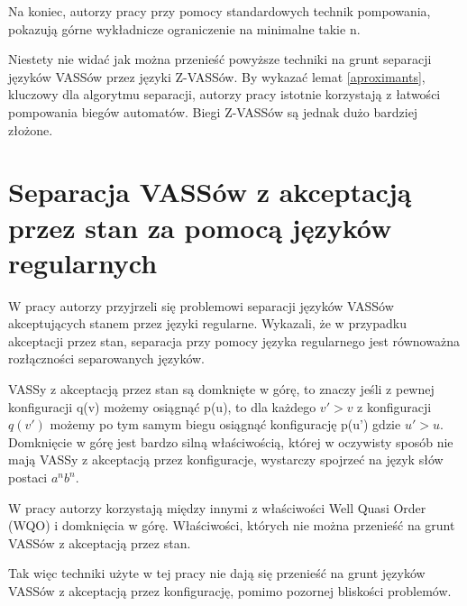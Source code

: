 \documentclass[magisterska]{pracamgr}
\begin{document}
    Na koniec, autorzy pracy przy pomocy standardowych technik pompowania, pokazują górne wykładnicze ograniczenie na minimalne takie n.

    Niestety nie widać jak można przenieść powyższe techniki na grunt separacji języków VASSów przez języki Z-VASSów.
    By wykazać lemat \ref{aproximants}, kluczowy dla algorytmu separacji, autorzy pracy istotnie korzystają z łatwości pompowania biegów automatów.
    Biegi Z-VASSów są jednak dużo bardziej złożone.


    \section{Separacja VASSów z akceptacją przez stan za pomocą języków regularnych}
    W pracy  \cite{sep1} autorzy przyjrzeli się problemowi separacji języków VASSów akceptujących stanem przez języki regularne.
    Wykazali, że w przypadku akceptacji przez stan, separacja przy pomocy języka regularnego jest równoważna rozłączności
    separowanych języków.

    VASSy z akceptacją przez stan są domknięte w górę, to znaczy jeśli z pewnej konfiguracji q(v) możemy osiągnąć p(u),
    to dla każdego $v' > v$ z konfiguracji $q(v')$ możemy po tym samym biegu osiągnąć konfigurację p(u') gdzie $u' > u$.
    Domknięcie w górę jest bardzo silną właściwością, której w oczywisty sposób nie mają VASSy z akceptacją przez konfiguracje,
    wystarczy spojrzeć na język słów postaci $a^n b^n$.


    W pracy autorzy korzystają między innymi z właściwości Well Quasi Order (WQO) i domknięcia w górę.
    Właściwości, których nie można przenieść na grunt VASSów z akceptacją przez stan.

    Tak więc techniki użyte w tej pracy nie dają się przenieść na grunt języków VASSów z akceptacją przez konfigurację,
    pomimo pozornej bliskości problemów.
\end{document}
